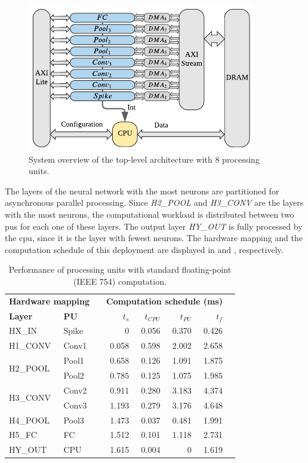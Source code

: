 \begin{figure}[b!]
	\centering
	\includegraphics[width=0.5\columnwidth]{./chapters/sbs_accelerator/figures/sbs_hw_experimental.pdf}
	\caption{System overview of the top-level architecture with 8 processing units.}
	\label{fig:hw_sbs_8_pu}
\end{figure}

The layers of the neural network with the most neurons are partitioned for asynchronous parallel processing. Since \emph{H2\_POOL} and \emph{H3\_CONV} are the layers with the most neurons, the computational workload is distributed between two \glspl{pu} for each one of these layers. The output layer \emph{HY\_OUT} is fully processed by the \gls{cpu}, since it is the layer with fewest neurons. The hardware mapping and the computation schedule of this deployment are displayed in  and , respectively.

\begin{table}[!t]\centering
	\caption{Performance of processing units with standard floating-point (IEEE 754) computation.}\label{tab:latency_fp}
	\scriptsize
	\begin{tabular}{llrrrrrr}\toprule
		\multicolumn{2}{c}{\textbf{Hardware mapping}} & &\multicolumn{4}{c}{\textbf{Computation schedule (ms)}} \\\cmidrule{1-2}\cmidrule{4-7}
		\textbf{Layer} &\textbf{PU} & &$t_s$ &$t_{CPU}$ &$t_{PU}$ &$t_f$ \\\midrule
		HX\_IN &Spike & &0 &0.056 &0.370 &0.426 \\
		H1\_CONV &Conv1 & &0.058 &0.598 &2.002 &2.658 \\
		\multirow{2}{*}{H2\_POOL}
		&Pool1 & &0.658 &0.126 &1.091 &1.875 \\
		&Pool2 & &0.785 &0.125 &1.075 &1.985 \\
		\multirow{2}{*}{H3\_CONV} 
		&Conv2 & &0.911 &0.280 &3.183 &4.374 \\
		&Conv3 & &1.193 &0.279 &3.176 &4.648 \\
		H4\_POOL &Pool3 & &1.473 &0.037 &0.481 &1.991 \\
		H5\_FC &FC & &1.512 &0.101 &1.118 &2.731 \\
		HY\_OUT &CPU & &1.615 &0.004 &0 &1.619 \\
		\bottomrule
	\end{tabular}
\end{table}

